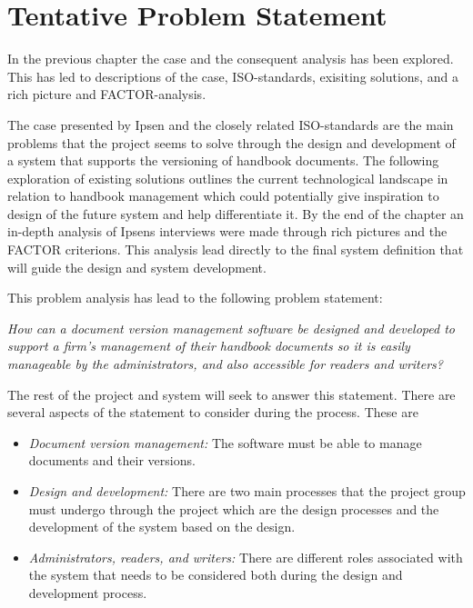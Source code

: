 \section{Tentative Problem Statement} \label{problemstatement}

In the previous chapter the case and the consequent analysis has been explored.
This has led to descriptions of the case, ISO-standards, exisiting solutions, and a rich picture and FACTOR-analysis.

The case presented by Ipsen and the closely related ISO-standards are the main problems that the project seems to solve through the design and development of a system that supports the versioning of handbook documents. 
The following exploration of existing solutions outlines the current technological landscape in relation to handbook management which could potentially give inspiration to design of the future system and help differentiate it.
By the end of the chapter an in-depth analysis of Ipsens interviews were made through rich pictures and the FACTOR criterions.
This analysis lead directly to the final system definition that will guide the design and system development.

This problem analysis has lead to the following problem statement:

\begin{center}
\textit{How can a document version management software be designed and developed to support a firm's management of their handbook documents so it is easily manageable by the administrators, and also accessible for readers and writers?}
\end{center}

The rest of the project and system will seek to answer this statement.
There are several aspects of the statement to consider during the process.
These are
\begin{itemize}
	\item \textit{Document version management:} The software must be able to manage documents and their versions.
	\item \textit{Design and development:} There are two main processes that the project group must undergo through the project which are the design processes and the development of the system based on the design.
	\item \textit{Administrators, readers, and writers:} There are different roles associated with the system that needs to be considered both during the design and development process.
\end{itemize}